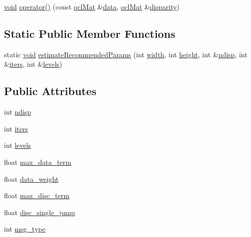 \begin{DoxyCompactItemize}
\item 
\hyperlink{legacy_8hpp_a8bb47f092d473522721002c86c13b94e}{void} \hyperlink{classcv_1_1ocl_1_1StereoBeliefPropagation_aedfe1a9f155a64b96a96ebd7955d3cbc}{operator()} (const \hyperlink{classcv_1_1ocl_1_1oclMat}{ocl\-Mat} \&\hyperlink{legacy_8hpp_ab9fe6c09e6d02865a953fffc12fe6ca0}{data}, \hyperlink{classcv_1_1ocl_1_1oclMat}{ocl\-Mat} \&\hyperlink{calib3d_8hpp_acd2ef073a3a4984e0a0ebac5c7e179fd}{disparity})
\end{DoxyCompactItemize}
\subsection*{Static Public Member Functions}
\begin{DoxyCompactItemize}
\item 
static \hyperlink{legacy_8hpp_a8bb47f092d473522721002c86c13b94e}{void} \hyperlink{classcv_1_1ocl_1_1StereoBeliefPropagation_a63a7afa42ced317bfd70312778abc7f1}{estimate\-Recommended\-Params} (int \hyperlink{highgui__c_8h_a2474a5474cbff19523a51eb1de01cda4}{width}, int \hyperlink{highgui__c_8h_adc7b4b8a6ef510e136071efbc9cd9a58}{height}, int \&\hyperlink{classcv_1_1ocl_1_1StereoBeliefPropagation_a541672ffe8afa99068b742829570028b}{ndisp}, int \&\hyperlink{classcv_1_1ocl_1_1StereoBeliefPropagation_aa2702237c1b0037e8cf170e42835a52a}{iters}, int \&\hyperlink{classcv_1_1ocl_1_1StereoBeliefPropagation_a94a623b9d2944487763d85320b4376ac}{levels})
\end{DoxyCompactItemize}
\subsection*{Public Attributes}
\begin{DoxyCompactItemize}
\item 
int \hyperlink{classcv_1_1ocl_1_1StereoBeliefPropagation_a541672ffe8afa99068b742829570028b}{ndisp}
\item 
int \hyperlink{classcv_1_1ocl_1_1StereoBeliefPropagation_aa2702237c1b0037e8cf170e42835a52a}{iters}
\item 
int \hyperlink{classcv_1_1ocl_1_1StereoBeliefPropagation_a94a623b9d2944487763d85320b4376ac}{levels}
\item 
float \hyperlink{classcv_1_1ocl_1_1StereoBeliefPropagation_abe56ab40d8aec981e8688cb42680d2ad}{max\-\_\-data\-\_\-term}
\item 
float \hyperlink{classcv_1_1ocl_1_1StereoBeliefPropagation_ada0c2b097db4bc66503e807ae3372e5d}{data\-\_\-weight}
\item 
float \hyperlink{classcv_1_1ocl_1_1StereoBeliefPropagation_a995935dbbab48a2c5364ff0fc92436e4}{max\-\_\-disc\-\_\-term}
\item 
float \hyperlink{classcv_1_1ocl_1_1StereoBeliefPropagation_a00488d4fd6bdfa6424a692eea43354ed}{disc\-\_\-single\-\_\-jump}
\item 
int \hyperlink{classcv_1_1ocl_1_1StereoBeliefPropagation_a9401a246fa1feaef37e777d4c17f6979}{msg\-\_\-type}
\end{DoxyCompactItemize}


